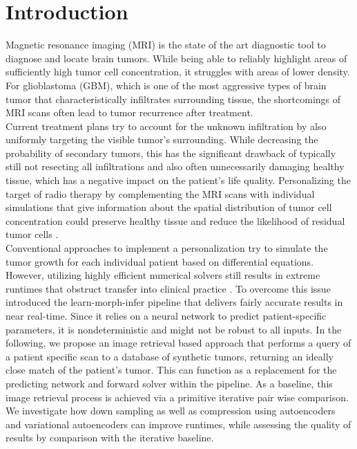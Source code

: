
\chapter{Introduction}\label{chapter:introduction}

Magnetic resonance imaging (MRI) is the state of the art diagnostic tool to diagnose and locate brain tumors. While being able to reliably highlight areas of sufficiently high tumor cell concentration, it struggles with areas of lower density.
For glioblastoma (GBM), which is one of the most aggressive types of brain tumor that characteristically infiltrates surrounding tissue, the shortcomings of MRI scans often lead to tumor recurrence after treatment.\\
Current treatment plans try to account for the unknown infiltration by also uniformly targeting the visible tumor's surrounding.
While decreasing the probability of secondary tumors, this has the significant drawback of typically still not resecting all infiltrations and also often unnecessarily damaging healthy tissue, which has a negative impact on the patient's life quality.
Personalizing the target of radio therapy by complementing the MRI scans with individual simulations that give information about the spatial distribution of tumor cell concentration could preserve healthy tissue and reduce the likelihood of residual tumor cells \parencite{Stupp2014} \parencite{Lipkova2019} \parencite{AdultGlioAlexander}.\\
Conventional approaches to implement a personalization try to simulate the tumor growth for each individual patient based on differential equations. 
However, utilizing highly efficient numerical solvers still results in extreme runtimes that obstruct transfer into clinical practice
\parencite{ezhov2021geometryaware}.
To overcome this issue \parencite{LearnMorphInfer} introduced the learn-morph-infer pipeline that delivers fairly accurate results in near real-time.
Since it relies on a neural network to predict patient-specific parameters, it is nondeterministic and might not be robust to all inputs.
In the following, we propose an image retrieval based approach that performs a query of a patient specific scan to a database of synthetic tumors, returning an ideally close match of the patient's tumor. This can function as a replacement for the predicting network and forward solver within the pipeline.
As a baseline, this image retrieval process is achieved via a primitive iterative pair wise comparison.
We investigate how down sampling as well as compression using autoencoders and variational autoencoders can improve runtimes, while assessing the quality of results by comparison with the iterative baseline.\\








